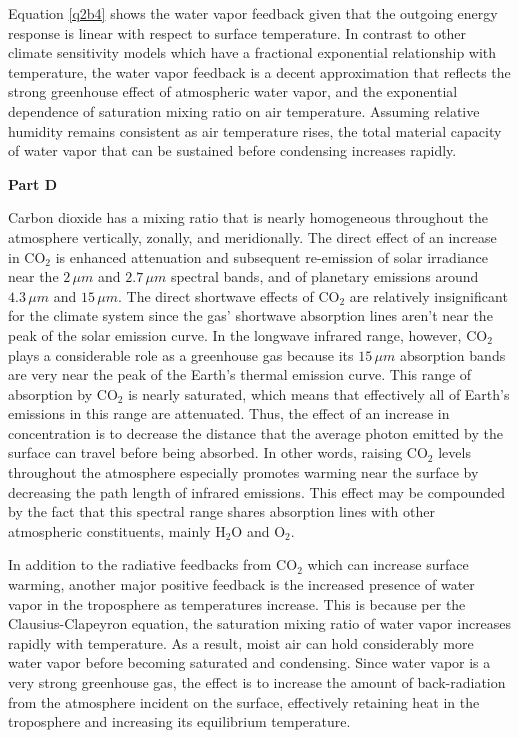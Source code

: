 \documentclass[12pt]{article}
\begin{document}
Equation \ref{q2b4} shows the water vapor feedback given that the outgoing energy response is linear with respect to surface temperature. In contrast to other climate sensitivity models which have a fractional exponential relationship with temperature, the water vapor feedback is a decent approximation that reflects the strong greenhouse effect of atmospheric water vapor, and the exponential dependence of saturation mixing ratio on air temperature. Assuming relative humidity remains consistent as air temperature rises, the total material capacity of water vapor that can be sustained before condensing increases rapidly.

\vspace{2em}\noindent\textbf{Part D}

Carbon dioxide has a mixing ratio that is nearly homogeneous throughout the atmosphere vertically, zonally, and meridionally. The direct effect of an increase in CO$_2$ is enhanced attenuation and subsequent re-emission of solar irradiance near the $2\,\si{\mu m}$ and $2.7\,\si{\mu m}$ spectral bands, and of planetary emissions around $4.3\,\si{\mu m}$ and $15\,\si{\mu m}$. The direct shortwave effects of CO$_2$ are relatively insignificant for the climate system since the gas' shortwave absorption lines aren't near the peak of the solar emission curve. In the longwave infrared range, however, CO$_2$ plays a considerable role as a greenhouse gas because its $15\,\si{\mu m}$ absorption bands are very near the peak of the Earth's thermal emission curve. This range of absorption by CO$_2$ is nearly saturated, which means that effectively all of Earth's emissions in this range are attenuated. Thus, the effect of an increase in concentration is to decrease the distance that the average photon emitted by the surface can travel before being absorbed. In other words, raising CO$_2$ levels throughout the atmosphere especially promotes warming near the surface by decreasing the path length of infrared emissions. This effect may be compounded by the fact that this spectral range shares absorption lines with other atmospheric constituents, mainly H$_2$O and O$_2$.

In addition to the radiative feedbacks from CO$_2$ which can increase surface warming, another major positive feedback is the increased presence of water vapor in the troposphere as temperatures increase. This is because per the Clausius-Clapeyron equation, the saturation mixing ratio of water vapor increases rapidly with temperature. As a result, moist air can hold considerably more water vapor before becoming saturated and condensing. Since water vapor is a very strong greenhouse gas, the effect is to increase the amount of back-radiation from the atmosphere incident on the surface, effectively retaining heat in the troposphere and increasing its equilibrium temperature.
\end{document}

